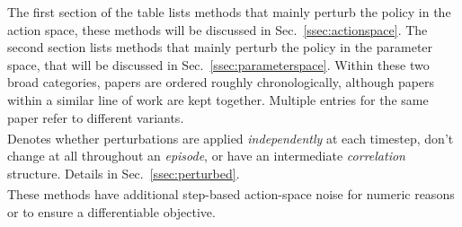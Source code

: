 \begin{table}
{    The first section of the table lists methods that mainly perturb the policy in the action space, these methods will be discussed in Sec.~\ref{ssec:actionspace}. The second section lists methods that mainly perturb the policy in the parameter space, that will be discussed in Sec.~\ref{ssec:parameterspace}. Within these two broad categories, papers are ordered roughly chronologically, although papers within a similar line of work are kept together. Multiple entries for the same paper refer to different variants. \\
    \textsuperscript{\textasteriskcentered} Denotes whether perturbations are applied \emph{independently} at each timestep, don't change at all throughout an \emph{episode}, or have an intermediate \emph{correlation} structure. Details in Sec.~\ref{ssec:perturbed}.\\ 
    \textsuperscript{\textdagger} These methods have additional step-based action-space noise for numeric reasons or to ensure a differentiable objective.  }
    \label{tab:policysearch}
\end{table}

